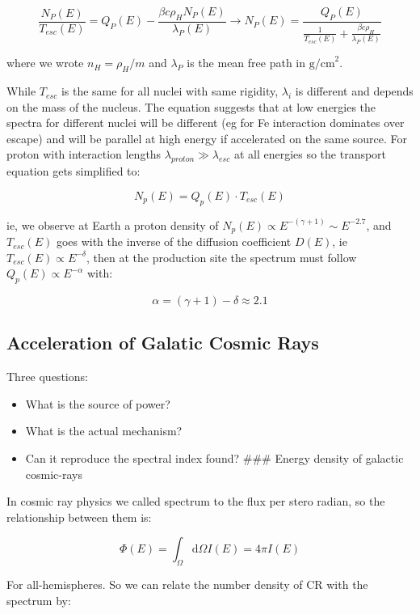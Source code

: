 \documentclass[
  letterpaper,
  DIV=11,
  numbers=noendperiod]{scrreprt}
\providecommand{\tightlist}{%
  \setlength{\itemsep}{0pt}\setlength{\parskip}{0pt}}\usepackage{longtable,booktabs,array}
\begin{document}
\[\frac{N_P(E)}{T_{esc}(E)} = Q_P(E) - \frac{\beta c \rho_H N_P(E)}{\lambda_P(E)} \rightarrow N_P(E) = \frac{Q_P(E)}{\frac{1}{T_{esc}(E)}+\frac{\beta c \rho_H}{\lambda_P(E)}}\]

where we wrote \(n_H = \rho_H/m\) and \(\lambda_P\) is the mean free
path in \(\mathrm{ g / cm}^2\).

While \(T_{esc}\) is the same for all nuclei with same rigidity,
\(\lambda_i\) is different and depends on the mass of the nucleus. The
equation suggests that at low energies the spectra for different nuclei
will be different (eg for Fe interaction dominates over escape) and will
be parallel at high energy if accelerated on the same source. For proton
with interaction lengths \(\lambda_{proton} \gg \lambda_{esc}\) at all
energies so the transport equation gets simplified to:

\[N_{p}(E) = Q_p(E)\cdot T_{esc}(E)\]

ie, we observe at Earth a proton density of
\(N_p(E)\propto E^{-(\gamma +1)} \sim E^{-2.7}\), and \(T_{esc}(E)\)
goes with the inverse of the diffusion coefficient \(D(E)\), ie
\(T_{esc}(E) \propto E^{-\delta}\), then at the production site the
spectrum must follow \(Q_p(E) \propto E^{-\alpha}\) with:

\[\alpha = (\gamma + 1) -\delta \approx 2.1\]

\subsection*{Acceleration of Galatic Cosmic
Rays}\label{acceleration-of-galatic-cosmic-rays}

Three questions:

\begin{itemize}
\tightlist
\item
  What is the source of power?
\item
  What is the actual mechanism?
\item
  Can it reproduce the spectral index found? \#\#\# Energy density of
  galactic cosmic-rays
\end{itemize}

In cosmic ray physics we called spectrum to the flux per stero radian,
so the relationship between them is:

\[\Phi (E) = \int_\Omega \mathrm{ d} \Omega I(E) = 4\pi I(E)\]

For all-hemispheres. So we can relate the number density of CR with the
spectrum by:
\end{document}
